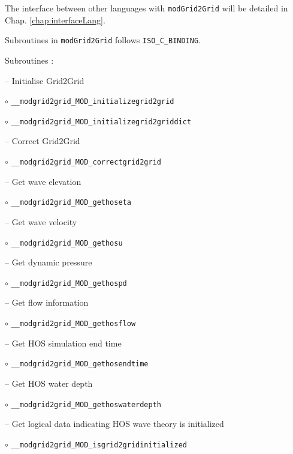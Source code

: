 The interface between other languages with \texttt{modGrid2Grid} will be detailed in Chap. \ref{chap:interfaceLang}. 

Subroutines in \texttt{modGrid2Grid} follows \texttt{ISO\_C\_BINDING}. 

\vspace{0.5cm}

Subroutines : 

\vspace{0.5cm}

-- Initialise Grid2Grid

\hspace{0.5 cm} $\circ$ \texttt{\_\_modgrid2grid\_MOD\_initializegrid2grid} 

\hspace{0.5 cm} $\circ$ \texttt{\_\_modgrid2grid\_MOD\_initializegrid2griddict}
\vspace{0.2cm}

-- Correct Grid2Grid

\hspace{0.5 cm} $\circ$ \texttt{\_\_modgrid2grid\_MOD\_correctgrid2grid}
\vspace{0.2cm}

-- Get wave elevation

\hspace{0.5 cm} $\circ$ \texttt{\_\_modgrid2grid\_MOD\_gethoseta}
\vspace{0.2cm}

-- Get wave velocity

\hspace{0.5 cm} $\circ$ \texttt{\_\_modgrid2grid\_MOD\_gethosu}
\vspace{0.2cm}

-- Get dynamic pressure

\hspace{0.5 cm} $\circ$ \texttt{\_\_modgrid2grid\_MOD\_gethospd}
\vspace{0.2cm}

-- Get flow information 

\hspace{0.5 cm} $\circ$ \texttt{\_\_modgrid2grid\_MOD\_gethosflow}
\vspace{0.2cm}

-- Get HOS simulation end time

\hspace{0.5 cm} $\circ$ \texttt{\_\_modgrid2grid\_MOD\_gethosendtime}
\vspace{0.2cm}

-- Get HOS water depth

\hspace{0.5 cm} $\circ$ \texttt{\_\_modgrid2grid\_MOD\_gethoswaterdepth}
\vspace{0.2cm}

-- Get logical data indicating HOS wave theory is initialized

\hspace{0.5 cm} $\circ$ \texttt{\_\_modgrid2grid\_MOD\_isgrid2gridinitialized}

